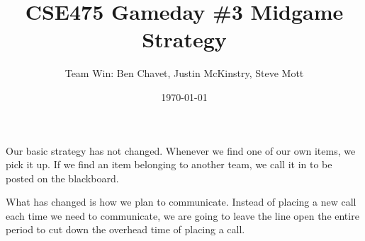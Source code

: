 \documentclass{article}
\title{CSE475 Gameday \#3 Midgame Strategy}
\author{Team Win: Ben Chavet, Justin McKinstry, Steve Mott}
\date{\today}
\begin{document}
\maketitle

Our basic strategy has not changed.  Whenever we find one of our own items,
we pick it up.  If we find an item belonging to another team, we call it in
to be posted on the blackboard.

What has changed is how we plan to communicate.  Instead of placing a new call
each time we need to communicate, we are going to leave the line open the
entire period to cut down the overhead time of placing a call.
\end{document}
